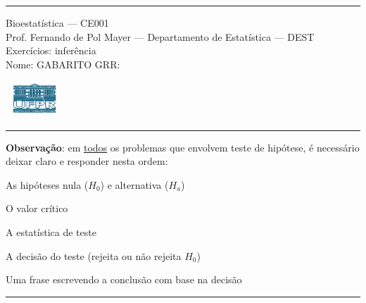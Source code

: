 \documentclass[a4paper,11pt,fleqn]{article}\usepackage[]{graphicx}\usepackage[]{color}
\theoremstyle{definition}
\begin{document}
\reversemarginpar %





\hrule
\vspace{0.3cm}

\begin{minipage}[c]{.85\textwidth}
  Bioestatística --- CE001 \\
  Prof. Fernando de Pol Mayer --- Departamento de Estatística --- DEST \\
  Exercícios: inferência \\
  Nome: GABARITO  \hfill GRR: \hspace{2cm}
\end{minipage}\hfill
\begin{minipage}[c]{.15\textwidth}
\flushright
\includegraphics[width=2.2cm]{../img/ufpr-logo.png}
\end{minipage}

\vspace{0.3cm}
\hrule
\vspace{0.3cm}

\textbf{Observação}: em \underline{todos} os problemas que envolvem
teste de hipótese, é necessário deixar claro e responder nesta ordem:
\begin{compactenum}[(a)]
\item As hipóteses nula ($H_0$) e alternativa ($H_a$)
\item O valor crítico
\item A estatística de teste
\item A decisão do teste (rejeita ou não rejeita $H_0$)
\item Uma frase escrevendo a conclusão com base na decisão
\end{compactenum}

\vspace{0.3cm}
\hrule
\vspace{0.3cm}
\end{document}
